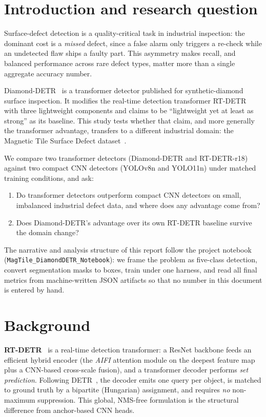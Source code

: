 \documentclass[11pt,a4paper]{article}
\begin{document}
\tableofcontents
\thispagestyle{empty}
\clearpage

\section{Introduction and research question}
Surface-defect detection is a quality-critical task in industrial inspection: the dominant cost is
a \emph{missed} defect, since a false alarm only triggers a re-check while an undetected flaw ships
a faulty part. This asymmetry makes recall, and balanced performance across rare defect types,
matter more than a single aggregate accuracy number.

Diamond-DETR~\cite{diamond} is a transformer detector published for synthetic-diamond surface
inspection. It modifies the real-time detection transformer RT-DETR~\cite{rtdetr} with three
lightweight components and claims to be ``lightweight yet at least as strong'' as its baseline.
This study tests whether that claim, and more generally the transformer advantage, transfers to a
different industrial domain: the Magnetic Tile Surface Defect dataset~\cite{magtile}.

We compare two transformer detectors (Diamond-DETR and RT-DETR-r18) against two compact CNN
detectors (YOLOv8n and YOLO11n) under matched training conditions, and ask:

\begin{enumerate}[leftmargin=1.4em,itemsep=2pt,topsep=2pt]
  \item Do transformer detectors outperform compact CNN detectors on small, imbalanced industrial
        defect data, and where does any advantage come from?
  \item Does Diamond-DETR's advantage over its own RT-DETR baseline survive the domain change?
\end{enumerate}

The narrative and analysis structure of this report follow the project notebook
(\texttt{MagTile\_DiamondDETR\_Notebook}): we frame the problem as five-class detection, convert
segmentation masks to boxes, train under one harness, and read all final metrics from
machine-written JSON artifacts so that no number in this document is entered by hand.

\section{Background}
\textbf{RT-DETR}~\cite{rtdetr} is a real-time detection transformer: a ResNet backbone feeds an
efficient hybrid encoder (the \emph{AIFI} attention module on the deepest feature map plus a
CNN-based cross-scale fusion), and a transformer decoder performs \emph{set prediction}. Following
DETR~\cite{detr}, the decoder emits one query per object, is matched to ground truth by a
bipartite (Hungarian) assignment, and requires \emph{no} non-maximum suppression. This global,
NMS-free formulation is the structural difference from anchor-based CNN heads.
\end{document}
